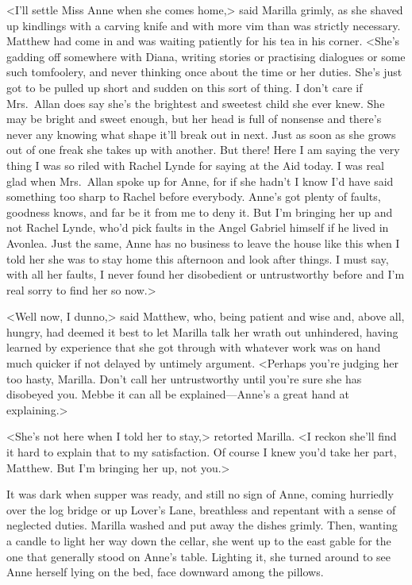 <I'll settle Miss Anne when she comes home,> said Marilla grimly, as she shaved up kindlings with a carving knife and with more vim than was strictly necessary. Matthew had come in and was waiting patiently for his tea in his corner. <She's gadding off somewhere with Diana, writing stories or practising dialogues or some such tomfoolery, and never thinking once about the time or her duties. She's just got to be pulled up short and sudden on this sort of thing. I don't care if Mrs.~Allan does say she's the brightest and sweetest child she ever knew. She may be bright and sweet enough, but her head is full of nonsense and there's never any knowing what shape it'll break out in next. Just as soon as she grows out of one freak she takes up with another. But there! Here I am saying the very thing I was so riled with Rachel Lynde for saying at the Aid today. I was real glad when Mrs.~Allan spoke up for Anne, for if she hadn't I know I'd have said something too sharp to Rachel before everybody. Anne's got plenty of faults, goodness knows, and far be it from me to deny it. But I'm bringing her up and not Rachel Lynde, who'd pick faults in the Angel Gabriel himself if he lived in Avonlea. Just the same, Anne has no business to leave the house like this when I told her she was to stay home this afternoon and look after things. I must say, with all her faults, I never found her disobedient or untrustworthy before and I'm real sorry to find her so now.>

<Well now, I dunno,> said Matthew, who, being patient and wise and, above all, hungry, had deemed it best to let Marilla talk her wrath out unhindered, having learned by experience that she got through with whatever work was on hand much quicker if not delayed by untimely argument. <Perhaps you're judging her too hasty, Marilla. Don't call her untrustworthy until you're sure she has disobeyed you. Mebbe it can all be explained—Anne's a great hand at explaining.>

<She's not here when I told her to stay,> retorted Marilla. <I reckon she'll find it hard to explain that to my satisfaction. Of course I knew you'd take her part, Matthew. But I'm bringing her up, not you.>

It was dark when supper was ready, and still no sign of Anne, coming hurriedly over the log bridge or up Lover's Lane, breathless and repentant with a sense of neglected duties. Marilla washed and put away the dishes grimly. Then, wanting a candle to light her way down the cellar, she went up to the east gable for the one that generally stood on Anne's table. Lighting it, she turned around to see Anne herself lying on the bed, face downward among the pillows.


